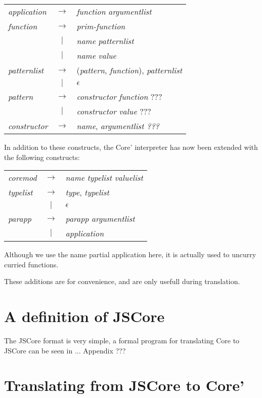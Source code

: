 \begin{longtable}{ l c l }

\emph{application} 	& $\rightarrow$ & \emph{function} \emph{argumentlist} \\

\emph{function} 	& $\rightarrow$ & \emph{prim-function} \\
			& $|$ 		& \emph{name} \emph{patternlist} \\
			& $|$ 		& \emph{name} \emph{value} \\

\emph{patternlist} 	& $\rightarrow$ & (\emph{pattern}, \emph{function}), 
\emph{patternlist} \\
			& $|$ 		& $\epsilon$ \\

\emph{pattern} 		& $\rightarrow$ & \emph{constructor} \emph{function} ??? \\
			& $|$ 		& \emph{constructor} \emph{value} ??? \\

\emph{constructor} 	& $\rightarrow$ & \emph{name}, \emph{argumentlist ???} \\

\end{longtable}

In addition to these constructs, the Core' interpreter has now been 
extended with the following constructs:

\begin{longtable}{ l c l }

\emph{coremod} 		& $\rightarrow$ & \emph{name} \emph{typelist} \emph{valuelist}\\

\emph{typelist}		& $\rightarrow$ & \emph{type}, \emph{typelist} \\
			& $|$		& $\epsilon$ \\

\emph{parapp} 		& $\rightarrow$ & \emph{parapp} \emph{argumentlist} \\
			& $|$ 		& \emph{application} \\

\end{longtable}

Although we use the name partial application here, it is actually used to
uncurry curried functions.

These additions are for convenience, and are only usefull during 
translation.





\section{A definition of JSCore}

The JSCore format is very simple, a formal program for translating
Core to JSCore can be seen in ... Appendix ???

\section{Translating from JSCore to Core'}

